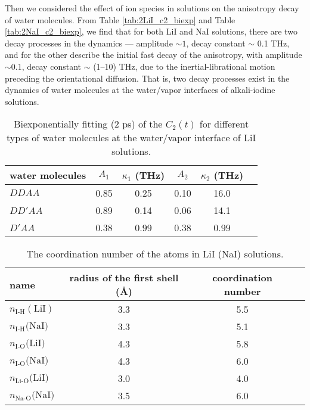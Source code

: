 Then we considered the effect of ion species in solutions on the anisotropy decay of water molecules.
From Table \ref{tab:2LiI_c2_biexp} and Table \ref{tab:2NaI_c2_biexp}, we find that 
for both LiI and NaI solutions, there are two decay processes in the dynamics --- amplitude $\sim 1$,
decay constant $\sim$ 0.1 THz, and for the other describe the initial fast decay 
of the anisotropy, with amplitude $\sim 0.1$, decay constant $\sim$ (1--10) THz, 
due to the inertial-librational motion preceding the orientational diffusion.
That is, two decay processes exist in the dynamics of water molecules 
at the water/vapor interfaces of alkali-iodine solutions. 
%
\begin{table}[H]
\centering
\caption{\label{tab:fitting_c2_for_each_type_of_water}%
  Biexponentially fitting (2 ps) of the $C_2(t)$ for different types of water molecules at the water/vapor interface of LiI solutions.}
\begin{tabular}{lccccc}
water molecules & $A_1$  & $\kappa_1$ (THz) & $A_2$ & $\kappa_2$ (THz) \\
\hline
$DDAA$ & 0.85 & 0.25 & 0.10 & 16.0\\
$DD'AA$ & 0.89 & 0.14 & 0.06 & 14.1 \\
$D'AA$ & 0.38 & 0.99 & 0.38 & 0.99 \\
\end{tabular}
\end{table}
%
\begin{table}[H] %
\centering
\caption{\label{tab:table_CoordNo}%
The coordination number of the atoms in LiI (NaI) solutions.}
\begin{tabular}{lccc}
name & radius of the first shell (\AA) & coordination number \\
\hline
$n_\text{I-H}(\text{LiI})$ & 3.3 & 5.5 \\
$n_\text{I-H}(\text{NaI)}$ & 3.3 & 5.1 \\
$n_\text{I-O}(\text{LiI)}$ & 4.3 & 5.8 \\
$n_\text{I-O}(\text{NaI)}$ & 4.3 & 6.0 \\
$n_\text{Li-O}(\text{LiI)}$ & 3.0 & 4.0 \\
$n_\text{Na-O}(\text{NaI)}$ & 3.5 & 6.0 
\end{tabular}
\end{table}

